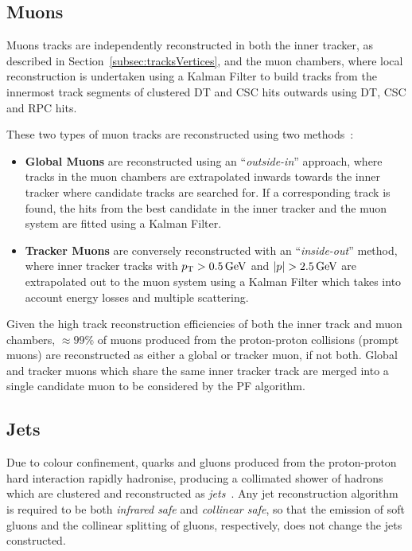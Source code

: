 \subsection{Muons}\label{subsec:muons}
Muons tracks are independently reconstructed in both the inner tracker, as described in Section~\ref{subsec:tracksVertices}, and the muon chambers, where local reconstruction is undertaken using a Kalman Filter to build tracks from the innermost track segments of clustered DT and CSC hits outwards using DT, CSC and RPC hits.

These two types of muon tracks are reconstructed using two methods~\cite{Chatrchyan:2012xi}:
\begin{itemize}
\item \textbf{Global Muons} are reconstructed using an ``\emph{outside-in}'' approach, where tracks in the muon chambers are extrapolated inwards towards the inner tracker where candidate tracks are searched for.
If a corresponding track is found, the hits from the best candidate in the inner tracker and the muon system are fitted using a Kalman Filter.
\item \textbf{Tracker Muons} are conversely reconstructed with an ``\emph{inside-out}'' method, where inner tracker tracks with $p_{\mathrm{T}} > 0.5\,\text{Ge\hspace{-.08em}V}$ and $|p| > 2.5\,\text{Ge\hspace{-.08em}V}$ are extrapolated out to the muon system using a Kalman Filter which takes into account energy losses and multiple scattering.
\end{itemize}

Given the high track reconstruction efficiencies of both the inner track and muon chambers, $\approx 99\%$ of muons produced from the proton-proton collisions (prompt muons) are reconstructed as either a global or tracker muon, if not both.
Global and tracker muons which share the same inner tracker track are merged into a single candidate muon to be considered by the PF algorithm.

\subsection{Jets}
Due to colour confinement, quarks and gluons produced from the proton-proton hard interaction rapidly hadronise, producing a collimated shower of hadrons which are clustered and reconstructed as \emph{jets}~\cite{Salam:2009jx}.
Any jet reconstruction algorithm is required to be both \emph{infrared safe} and \emph{collinear safe}, \ie so that the emission of soft gluons and the collinear splitting of gluons, respectively, does not change the jets constructed.

